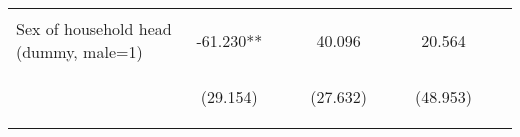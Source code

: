 \begin{center}
\begin{tabular}{lccccccccc}
\vspace{4pt} & \begin{footnotesize}[0.541]\end{footnotesize} & \begin{footnotesize}[0.752]\end{footnotesize} & \begin{footnotesize}[0.926]\end{footnotesize} & \begin{footnotesize}[0.891]\end{footnotesize} & \begin{footnotesize}[0.557]\end{footnotesize} & \begin{footnotesize}[0.011]\end{footnotesize} & \begin{footnotesize}[0.714]\end{footnotesize} & \begin{footnotesize}[0.066]\end{footnotesize} & \begin{footnotesize}[0.210]\end{footnotesize} \\
Sex of household head (dummy, male=1) & -61.230** &  &  & 40.096 &  &  & 20.564 &  &  \\
 & \begin{footnotesize}(29.154)\end{footnotesize} & \begin{footnotesize}\end{footnotesize} & \begin{footnotesize}\end{footnotesize} & \begin{footnotesize}(27.632)\end{footnotesize} & \begin{footnotesize}\end{footnotesize} & \begin{footnotesize}\end{footnotesize} & \begin{footnotesize}(48.953)\end{footnotesize} & \begin{footnotesize}\end{footnotesize} & \begin{footnotesize}\end{footnotesize} \\

\end{tabular}
\end{center}
